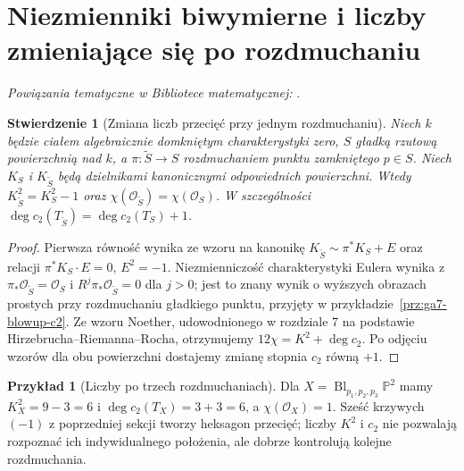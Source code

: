 \documentclass[11pt,a4paper,openany]{report}
\numberwithin{equation}{section}
\theoremstyle{plain}
\newtheorem{stwierdzenie}[twierdzenie]{Stwierdzenie}
\theoremstyle{definition}
\newtheorem{przyklad}[twierdzenie]{Przykład}
\theoremstyle{remark}
\newcommand{\PP}{\mathbb P}
\begin{document}
\section{Niezmienniki biwymierne i liczby zmieniające się po rozdmuchaniu}
\label{sec:ga8-invariants}

\noindent\emph{Powiązania tematyczne w Bibliotece matematycznej:} .


\begin{stwierdzenie}[Zmiana liczb przecięć przy jednym rozdmuchaniu]
\label{st:ga8-classes-blowup}
Niech $k$ będzie ciałem algebraicznie domkniętym
charakterystyki zero, $S$ gładką rzutową powierzchnią
nad $k$, a $\pi:\widetilde S\to S$ rozdmuchaniem punktu
zamkniętego $p\in S$. Niech $K_S$ i
$K_{\widetilde S}$ będą dzielnikami kanonicznymi
odpowiednich powierzchni. Wtedy
$K_{\widetilde S}^2=K_S^2-1$ oraz
$\chi(\mathcal O_{\widetilde S})=\chi(\mathcal O_S)$.
W szczególności $\deg c_2(T_{\widetilde S})=
\deg c_2(T_S)+1$.
\end{stwierdzenie}
\begin{proof}
Pierwsza równość wynika ze wzoru na kanonikę
$K_{\widetilde S}\sim\pi^*K_S+E$ oraz relacji
$\pi^*K_S\cdot E=0$, $E^2=-1$.
Niezmienniczość charakterystyki Eulera wynika z
$\pi_*\mathcal O_{\widetilde S}=\mathcal O_S$
i $R^j\pi_*\mathcal O_{\widetilde S}=0$ dla $j>0$;
jest to znany wynik o wyższych obrazach prostych przy
rozdmuchaniu gładkiego punktu, przyjęty w
przykładzie~\ref{prz:ga7-blowup-c2}.
Ze wzoru Noether, udowodnionego w rozdziale 7
na podstawie Hirzebrucha--Riemanna--Rocha,
otrzymujemy $12\chi=K^2+\deg c_2$.
Po odjęciu wzorów dla obu powierzchni dostajemy
zmianę stopnia $c_2$ równą $+1$.
\end{proof}

\begin{przyklad}[Liczby po trzech rozdmuchaniach]
Dla $X=\operatorname{Bl}_{p_1,p_2,p_3}\PP^2$
mamy $K_X^2=9-3=6$ i $\deg c_2(T_X)=3+3=6$,
a $\chi(\mathcal O_X)=1$. Sześć krzywych $(-1)$
z poprzedniej sekcji tworzy heksagon przecięć;
liczby $K^2$ i $c_2$ nie pozwalają rozpoznać
ich indywidualnego położenia, ale dobrze
kontrolują kolejne rozdmuchania.
\end{przyklad}
\end{document}
